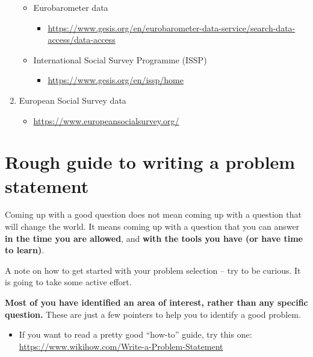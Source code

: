 \documentclass[
]{book}
\providecommand{\tightlist}{%
  \setlength{\itemsep}{0pt}\setlength{\parskip}{0pt}}
\begin{document}
\begin{enumerate}
  \begin{itemize}
  \tightlist
  \item
    Eurobarometer data

    \begin{itemize}
    \tightlist
    \item
      \url{https://www.gesis.org/en/eurobarometer-data-service/search-data-access/data-access}
    \end{itemize}
  \item
    International Social Survey Programme (ISSP)

    \begin{itemize}
    \tightlist
    \item
      \url{https://www.gesis.org/en/issp/home}
    \end{itemize}
  \end{itemize}
\item
  European Social Survey data

  \begin{itemize}
  \tightlist
  \item
    \url{https://www.europeansocialsurvey.org/}
  \end{itemize}
\end{enumerate}

\hypertarget{rough-guide-to-writing-a-problem-statement}{%
\chapter{Rough guide to writing a problem statement}\label{rough-guide-to-writing-a-problem-statement}}

Coming up with a good question does not mean coming up with a question
that will change the world. It means coming up with a question that you
can answer \textbf{in the time you are allowed}, and \textbf{with the tools you
have (or have time to learn)}.

A note on how to get started with your problem selection -- try to be
curious. It is going to take some active effort.

\textbf{Most of you have identified an area of interest, rather than any
specific question.} These are just a few pointers to help you to
identify a good problem.

\begin{itemize}
\tightlist
\item
  If you want to read a pretty good ``how-to'' guide, try this one:
  \url{https://www.wikihow.com/Write-a-Problem-Statement}
\end{itemize}
\end{document}
